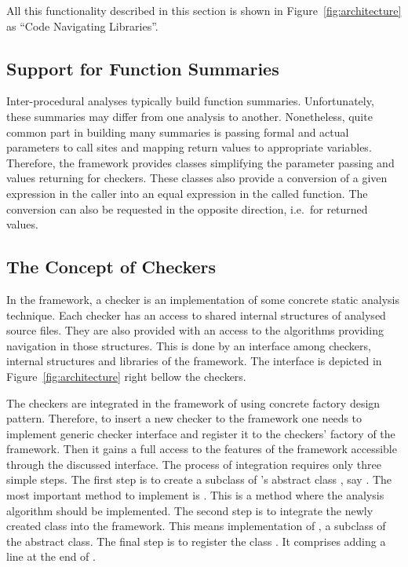 All this functionality described in this section is shown in
Figure~\ref{fig:architecture} as ``Code Navigating Libraries''.

\subsection*{Support for Function Summaries}\label{ssec:summaries}

Inter-procedural analyses typically build function summaries. Unfortunately,
these summaries may differ from one analysis to another. Nonetheless, quite
common part in building many summaries is passing formal and actual parameters
to call sites and mapping return values to appropriate variables. Therefore,
the \stan framework provides classes simplifying the parameter passing and
values returning for checkers. These classes also provide a conversion of a
given expression in the caller into an equal expression in the called
function. The conversion can also be requested in the opposite direction,
i.e.\ for returned values.

\subsection*{The Concept of Checkers}

In the \stan framework, a checker is an implementation of some concrete
static analysis technique. Each checker has an access to shared internal
structures of analysed source files. They are also provided with an access to
the algorithms providing navigation in those structures. This is done by an
interface among checkers, internal structures and libraries of the framework.
The interface is depicted in Figure~\ref{fig:architecture} right bellow the
checkers.

The checkers are integrated in the framework of \stan using concrete factory
design pattern. Therefore, to insert a new checker to the framework one needs
to implement generic checker interface and register it to the checkers'
factory of the framework. Then it gains a full access to the features of the
framework accessible through the discussed interface.  The process of
integration requires only three simple steps. The first step is to create a
subclass of \stan's abstract class , say .
The most important method to implement is . This is a method where
the analysis algorithm should be implemented. The second step is to integrate
the newly created class into the framework. This means implementation of
, a subclass of the  abstract
class. The final step is to register the class . It
comprises adding a line 
at the end of .

